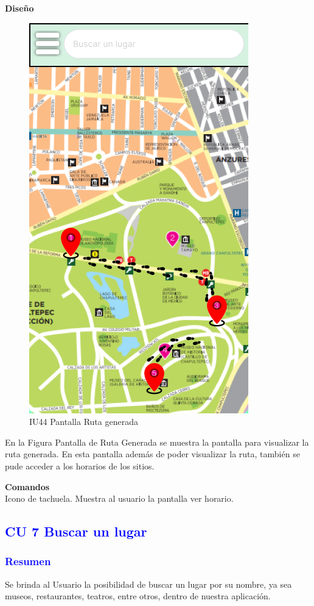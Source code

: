 \textbf{Diseño}
    \begin{figure}[h]
        
            \centering
            \includegraphics[width=.4\linewidth]{Pantallas Prototipo3/IU44-Ruta generada.jpg}
        \caption{IU44 Pantalla Ruta generada}
    
    \end{figure}

En la Figura Pantalla de Ruta Generada se muestra la pantalla para visualizar la ruta generada. En esta pantalla además
de poder visualizar la ruta, también se pude acceder a los horarios de los sitios.

\textbf{Comandos} \\
Icono de tachuela. Muestra al usuario la pantalla ver horario.





\newpage
\subsection{\textcolor{blue}{CU 7 Buscar un lugar}}

\subsubsection{\textcolor{blue}{Resumen}}
Se brinda al Usuario la posibilidad de buscar un lugar por su nombre, ya sea museos, restaurantes, teatros, entre otros, dentro de nuestra aplicación.

